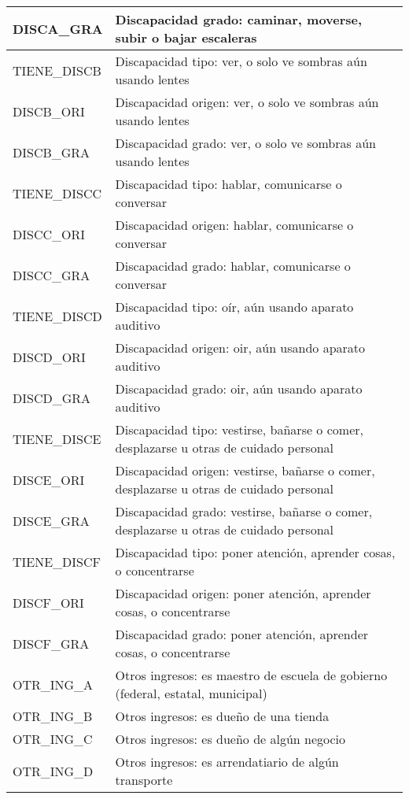 \begin{longtable}{|p{8cm}|p{8cm}|}
    \hline
    DISCA\_GRA & Discapacidad grado:  caminar, moverse, subir o bajar escaleras \\
    \hline
    TIENE\_DISCB & Discapacidad tipo: ver, o solo ve sombras aún usando lentes \\
    \hline
    DISCB\_ORI & Discapacidad origen: ver, o solo ve sombras aún usando lentes \\
    \hline
    DISCB\_GRA & Discapacidad grado: ver, o solo ve sombras aún usando lentes \\
    \hline
    TIENE\_DISCC & Discapacidad tipo: hablar, comunicarse o conversar \\
    \hline
    DISCC\_ORI & Discapacidad origen: hablar, comunicarse o conversar \\
    \hline
    DISCC\_GRA & Discapacidad grado: hablar, comunicarse o conversar \\
    \hline
    TIENE\_DISCD & Discapacidad tipo: oír, aún usando aparato auditivo \\
    \hline
    DISCD\_ORI & Discapacidad origen: oir, aún usando aparato auditivo\\
    \hline
    DISCD\_GRA & Discapacidad grado: oir, aún usando aparato auditivo\\
    \hline
    TIENE\_DISCE & Discapacidad tipo: vestirse, bañarse o comer, desplazarse u otras de cuidado personal\\
    \hline
    DISCE\_ORI & Discapacidad origen: vestirse, bañarse o comer, desplazarse u otras de cuidado personal\\
    \hline
    DISCE\_GRA & Discapacidad grado: vestirse, bañarse o comer, desplazarse u otras de cuidado personal\\
    \hline
    TIENE\_DISCF & Discapacidad tipo: poner atención, aprender cosas, o concentrarse\\
    \hline
    DISCF\_ORI & Discapacidad origen: poner atención, aprender cosas, o concentrarse\\
    \hline
    DISCF\_GRA & Discapacidad grado: poner atención, aprender cosas, o concentrarse\\
    \hline
    OTR\_ING\_A & Otros ingresos: es maestro de escuela de gobierno (federal, estatal, municipal) \\
    \hline
    OTR\_ING\_B & Otros ingresos: es dueño de una tienda\\
    \hline
    OTR\_ING\_C & Otros ingresos: es dueño de algún negocio\\
    \hline
    OTR\_ING\_D & Otros ingresos: es arrendatiario de algún transporte\\

\end{longtable}

